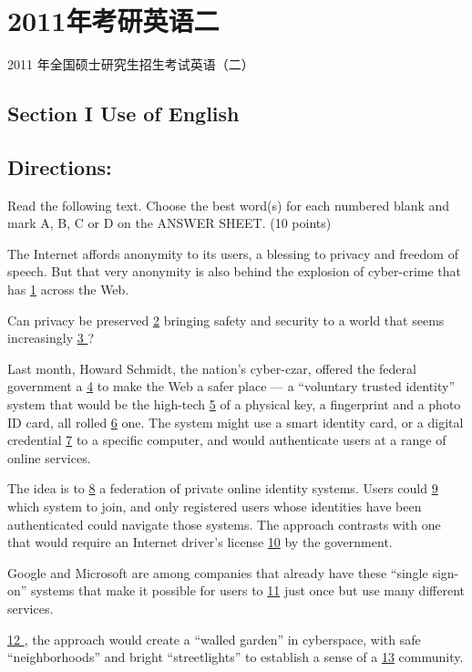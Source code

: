 \documentclass[UTF8,11pt]{ctexart}
\begin{document}
\section*{2011年考研英语二}
2011 年全国硕士研究生招生考试英语（二）


\subsection*{\textbf{Section I Use of English}}


\subsection*{\textbf{Directions:}}


Read the following text. Choose the best word(s) for each numbered blank and mark A, B, C or D on the ANSWER SHEET. (10 points)


The Internet affords anonymity to its users, a blessing to privacy and freedom of speech. But that very anonymity is also behind the explosion of cyber-crime that has \uline{1} across the Web.


Can privacy be preserved \uline{2} bringing safety and security to a world that seems increasingly \uline{3 }?


Last month, Howard Schmidt, the nation’s cyber-czar, offered the federal government a \uline{4} to make the Web a safer place — a “voluntary trusted identity” system that would be the high-tech \uline{5} of a physical key, a fingerprint and a photo ID card, all rolled \uline{6} one. The system might use a smart identity card, or a digital credential \uline{7} to a specific computer, and would authenticate users at a range of online services.


The idea is to \uline{8} a federation of private online identity systems. Users could \uline{9} which system to join, and only registered users whose identities have been authenticated could navigate those systems. The approach contrasts with one that would require an Internet driver’s license \uline{10} by the government.


Google and Microsoft are among companies that already have these “single sign-on” systems that make it possible for users to \uline{11} just once but use many different services.


\uline{12 }, the approach would create a “walled garden” in cyberspace, with safe “neighborhoods” and bright “streetlights” to establish a sense of a \uline{13} community.
\end{document}
